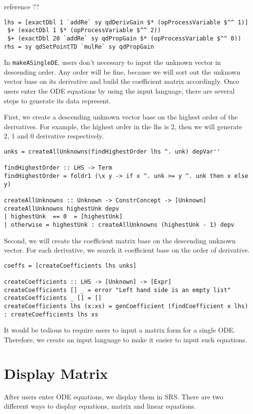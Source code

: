 reference ??
\begin{lstlisting}[language=HaskellUlisses]
lhs = [exactDbl 1 `addRe` sy qdDerivGain $* (opProcessVariable $^^ 1)]
 $+ (exactDbl 1 $* (opProcessVariable $^^ 2))
 $+ (exactDbl 20 `addRe` sy qdPropGain $* (opProcessVariable $^^ 0))
rhs = sy qdSetPointTD `mulRe` sy qdPropGain
\end{lstlisting}

In \verb|makeASingleDE|, users don't necessary to input the unknown vector in descending order. Any order will be fine, because we will sort out the unknown vector base on its derivative and build the coefficient matrix accordingly. Once users enter the ODE equations by using the input language, there are several steps to generate its data represent.

First, we create a descending unknown vector base on the highest order of the derivatives. For example, the highest order in the lhs is 2, then we will generate 2, 1 and 0 derivative respectively.

\begin{lstlisting}[language=HaskellUlisses]
unks = createAllUnknowns(findHighestOrder lhs ^. unk) depVar''

findHighestOrder :: LHS -> Term
findHighestOrder = foldr1 (\x y -> if x ^. unk >= y ^. unk then x else y)

createAllUnknowns :: Unknown -> ConstrConcept -> [Unknown]
createAllUnknowns highestUnk depv
| highestUnk  == 0  = [highestUnk]
| otherwise = highestUnk : createAllUnknowns (highestUnk - 1) depv
\end{lstlisting}

Second, we will create the coefficient matrix base on the descending unknown vector. For each derivative, we search it coefficient base on the order of derivative.

\begin{lstlisting}[language=HaskellUlisses]
coeffs = [createCoefficients lhs unks]

createCoefficients :: LHS -> [Unknown] -> [Expr]
createCoefficients [] _ = error "Left hand side is an empty list"
createCoefficients _ [] = []
createCoefficients lhs (x:xs) = genCoefficient (findCoefficient x lhs) : createCoefficients lhs xs
\end{lstlisting}

It would be tedious to require users to input a matrix form for a single ODE. Therefore, we create an input language to make it easier to input such equations.

\section{Display Matrix}
After users enter ODE equations, we display them in SRS. There are two different ways to display equations, matrix and linear equations.

